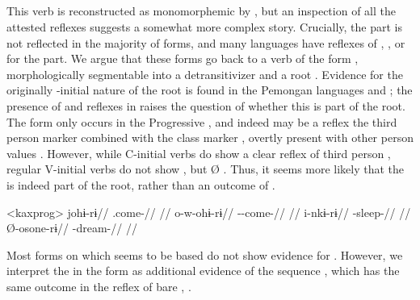 \subsection{ }
\label{sec:come}



This verb is reconstructed as monomorphemic  by \textcite[30]{gildea2007greenberg}, but an inspection of all the attested reflexes  suggests a somewhat more complex story.
Crucially, the  part is not reflected in the majority of forms, and many languages have reflexes of , , or  for the  part.
We argue that these forms go back to a \PC verb of the form , morphologically segmentable into a detransitivizer and a root .
Evidence for the originally -initial nature of the root is found in the Pemongan languages and \kaxui; the presence of  and  reflexes in \kaxui raises the question of whether this  is part of the root.
The \kaxui form  only occurs in the Progressive , and indeed  may be a reflex the \settwo third person marker  combined with the  class marker , overtly present with other person values .
However, while C-initial verbs do show a clear reflex of third person  , regular V-initial verbs do not show , but Ø .
Thus, it seems more likely that the  is indeed part of the root, rather than an outcome of .

\pex<kaxprog>\kaxui {}
\begingl
\gla johɨ-rɨ//
\glb {}.come-//
\glft {}//
\endgl
{}
\begingl
\gla o-w-ohɨ-rɨ//
\glb {}--come-//
\glft {}//
\endgl
{}
\begingl
\gla i-nkɨ-rɨ//
\glb {}-sleep-//
\glft {}//
\endgl
{}
\begingl
\gla Ø-osone-rɨ//
\glb {}-dream-//
\glft {}//
\endgl
\xe
%

Most forms on which   seems to be based do not show evidence for .
However, we interpret the  in the \akawaio form  as additional evidence of the sequence , which has the same outcome  in the \macushi reflex of bare , .

